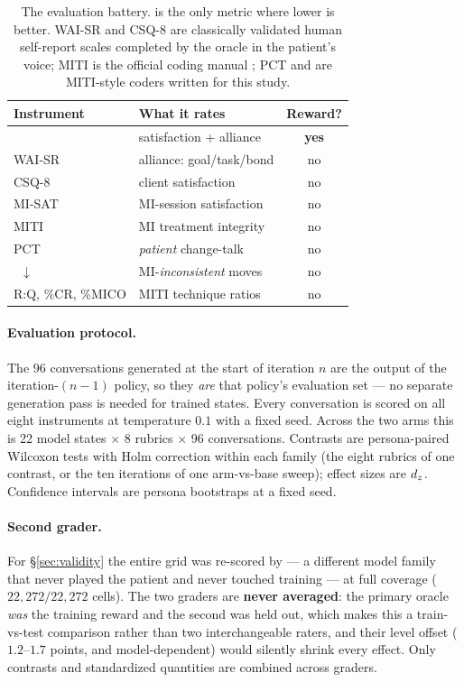 \begin{table}[t]
  \centering\small
  \setlength{\tabcolsep}{4pt}
  \begin{tabular}{@{}llc@{}}
    \toprule
    Instrument & What it rates & Reward?\\
    \midrule
    \QQ{}       & satisfaction + alliance   & \textbf{yes}\\
    WAI-SR      & alliance: goal/task/bond  & no\\
    CSQ-8       & client satisfaction       & no\\
    MI-SAT      & MI-session satisfaction   & no\\
    MITI        & MI treatment integrity    & no\\
    PCT         & \emph{patient} change-talk & no\\
    \mici{}~$\downarrow$ & MI-\emph{inconsistent} moves & no\\
    R:Q, \%CR, \%MICO & MITI technique ratios & no\\
    \bottomrule
  \end{tabular}
  \caption{The evaluation battery. \mici{} is the only metric where lower is better. WAI-SR
  \citep{hatcher2006waisr} and CSQ-8 \citep{larsen1979csq} are classically validated human
  self-report scales completed by the oracle in the patient's voice; MITI is the official
  coding manual \citep{moyers2016miti}; PCT and \mici{} are MITI-style coders written for
  this study.}
  \label{tab:instruments}
\end{table}

\paragraph{Evaluation protocol.}
The 96 conversations generated at the start of iteration $n$ are the output of the
iteration-$(n\!-\!1)$ policy, so they \emph{are} that policy's evaluation set --- no
separate generation pass is needed for trained states. Every conversation is scored on all
eight instruments at temperature $0.1$ with a fixed seed. Across the two arms this is 22
model states $\times$ 8 rubrics $\times$ 96 conversations. Contrasts are persona-paired
Wilcoxon tests with Holm correction within each family (the eight rubrics of one contrast,
or the ten iterations of one arm-vs-base sweep); effect sizes are $d_z{}$. Confidence
intervals are persona bootstraps at a fixed seed.

\paragraph{Second grader.}
For \S\ref{sec:validity} the entire grid was re-scored by \heldoutjudge{} --- a different
model family that never played the patient and never touched training --- at full coverage
($22{,}272/22{,}272$ cells). The two graders are \textbf{never averaged}: the primary
oracle \emph{was} the training reward and the second was held out, which makes this a
train-vs-test comparison rather than two interchangeable raters, and their level offset
($1.2$--$1.7$ points, and model-dependent) would silently shrink every effect. Only
contrasts and standardized quantities are combined across graders.
